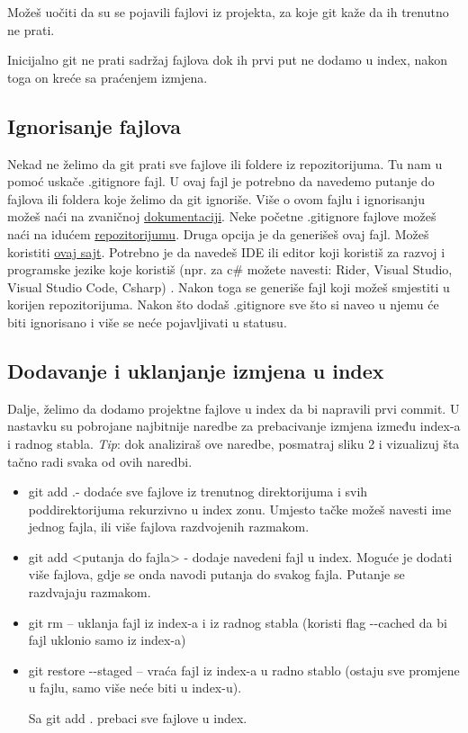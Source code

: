 \documentclass[11pt,a4paper]{article}
\begin{document}
Možeš uočiti da su se pojavili fajlovi iz projekta, za koje git kaže da
ih trenutno ne prati.

Inicijalno git ne prati sadržaj fajlova dok ih prvi put ne dodamo u
index, nakon toga on kreće sa praćenjem izmjena.

\subsection{Ignorisanje fajlova}

Nekad ne želimo da git prati sve fajlove ili foldere iz repozitorijuma.
Tu nam u pomoć uskače .gitignore fajl. U ovaj fajl je potrebno da
navedemo putanje do fajlova ili foldera koje želimo da git ignoriše.
Više o ovom fajlu i ignorisanju možeš naći na zvaničnoj
\href{https://git-scm.com/docs/gitignore}{dokumentaciji}. Neke početne
.gitignore fajlove možeš naći na idućem
\href{https://github.com/github/gitignore}{repozitorijumu}. Druga opcija
je da generišeš ovaj fajl. Možeš koristiti
\href{https://www.toptal.com/developers/gitignore}{ovaj sajt}. Potrebno
je da navedeš IDE ili editor koji koristiš za razvoj i programske jezike
koje koristiš (npr. za c\# možete navesti: Rider, Visual Studio, Visual
Studio Code, Csharp) . Nakon toga se generiše fajl koji možeš smjestiti
u korijen repozitorijuma. Nakon što dodaš .gitignore sve što si naveo u
njemu će biti ignorisano i više se neće pojavljivati u statusu.

\subsection{Dodavanje i uklanjanje izmjena u
index}

Dalje, želimo da dodamo projektne fajlove u index da bi napravili prvi
commit. U nastavku su pobrojane najbitnije naredbe za prebacivanje
izmjena između index-a i radnog stabla. \emph{Tip}: dok analiziraš ove
naredbe, posmatraj sliku 2 i vizualizuj šta tačno radi svaka od ovih
naredbi.

\begin{itemize}
\item
  git add .- dodaće sve fajlove iz trenutnog direktorijuma i svih
  poddirektorijuma rekurzivno u index zonu. Umjesto tačke možeš navesti
  ime jednog fajla, ili više fajlova razdvojenih razmakom.
\item
  git add \textless putanja do fajla\textgreater{} - dodaje navedeni
  fajl u index. Moguće je dodati više fajlova, gdje se onda navodi
  putanja do svakog fajla. Putanje se razdvajaju razmakom.
\item
  git rm -- uklanja fajl iz index-a i iz radnog stabla (koristi flag
  -\/-cached da bi fajl uklonio samo iz index-a)
\item
  git restore -\/-staged -- vraća fajl iz index-a u radno stablo (ostaju
  sve promjene u fajlu, samo više neće biti u index-u).

  Sa git add . prebaci sve fajlove u index.
\end{itemize}
\end{document}
